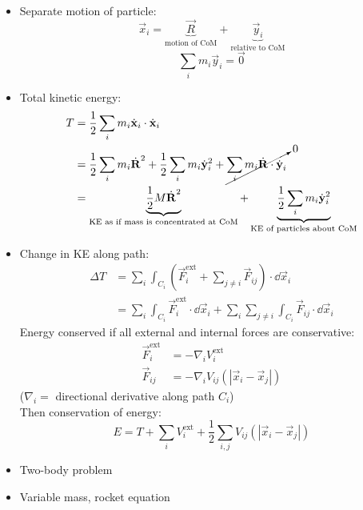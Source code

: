 \begin{itemize}
      \item Separate motion of particle:
            \[ \vec{x}_i = \underbrace{\vec{R}}_{\text{motion of CoM}} + \underbrace{\vec{y}_i}_{\text{relative to CoM}}\]
            \[\sum_i m_i \vec{y}_i = \vec{0}\]
      \item Total kinetic energy:
            \begin{align*}
                  T & = \frac{1}{2} \sum_i m_i \dot{\vec{x}}_i \cdot \dot{\vec{x}}_i                                                                                                                        \\
                    & = \frac{1}{2} \sum_i m_i \dot{\vec{R}}^2 + \frac{1}{2} \sum_i m_i \dot{\vec{y}}_i^2 + \cancelto{0}{\sum_i m_i \dot{\vec{R}} \cdot  \dot{\vec{y}}_i}                                   \\
                    & = \underbrace{\frac{1}{2} M \dot{\vec{R}}^2}_{\text{KE as if mass is concentrated at CoM}} + \underbrace{\frac{1}{2} \sum_i m_i \dot{\vec{y}}_i^2}_{\text{KE of particles about CoM}}
            \end{align*}
      \item Change in KE along path:
            \begin{align*}
                  \Delta T & = \sum_i \int_{C_i} \left( \vec{F}^{\text{ext}}_i + \sum_{j\neq i} \vec{F}_{ij} \right)\cdot \dd \vec{x}_i                         \\
                           & = \sum_i \int_{C_i} \vec{F}^{\text{ext}}_i \cdot \dd \vec{x}_i + \sum_i \sum_{j\neq i} \int_{C_i} \vec{F}_{ij} \cdot \dd \vec{x}_i
            \end{align*}
            Energy conserved if all external and internal forces are conservative:
            \begin{align*}
                  \vec{F}^{\text{ext}}_i & = - \nabla_i V^{\text{ext}}_i              \\
                  \vec{F}_{ij}           & = - \nabla_i V_{ij}(|\vec{x}_i-\vec{x}_j|)
            \end{align*}
            ($\nabla_i = $ directional derivative along path $C_i$) \\
            Then conservation of energy: \[E = T+ \sum_i V^{\text{ext}}_i + \frac{1}{2} \sum_{i,j}  V_{ij}(|\vec{x}_i-\vec{x}_j|) \]
      \item Two-body problem
      \item Variable mass, rocket equation


\end{itemize}

